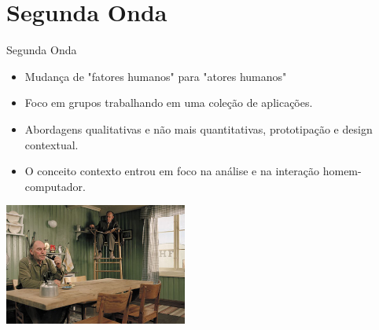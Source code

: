 \section{Segunda Onda}

\begin{frame}[t, fragile]{Segunda Onda}
    \begin{itemize}
    	\item Mudança de "fatores humanos" para "\alert{atores humanos}"
    	\item Foco em \alert{grupos} trabalhando em uma coleção de aplicações.
    	\item Abordagens \alert{qualitativas} e não mais quantitativas, prototipação e design contextual.
    	\item O conceito \alert{contexto}
    	entrou em foco na análise e na interação homem-computador.    
    \end{itemize}   
    \begin{flushright}
    	\includegraphics[width=0.45\textwidth]{imagens/segunda-onda}
    \end{flushright}
\end{frame}